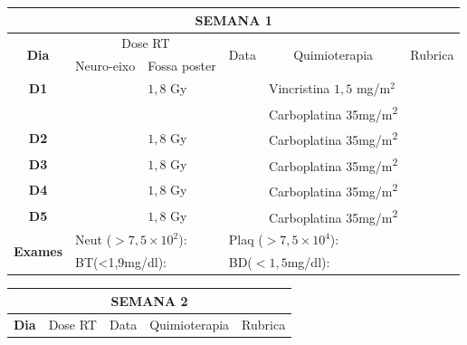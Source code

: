 \documentclass[11pt,a4paper,oldfontcommands]{memoir}
\begin{document}
\begin{center}
\begin{longtable}{p{1cm}p{2cm}|p{2cm}|p{1cm}|p{4cm}|p{3cm}}
	\hline
	\multicolumn{6}{c}{\textbf{SEMANA 1}}\\
\hline
    \multicolumn{1}{c|}{\multirow{2}{*}{\textbf{Dia}}}&\multicolumn{2}{c|}{Dose RT}&\multicolumn{1}{c|}{\multirow{2}{*}{Data}}&\multicolumn{1}{c|}{\multirow{2}{*}{Quimioterapia}}&\multicolumn{1}{c}{\multirow{2}{*}{Rubrica}} \\
    \cline{2-3}
    \multicolumn{1}{c|}{\multirow{1}{*}{}}&{Neuro-eixo}&{Fossa poster}&& \\
	\hline
	\multicolumn{1}{c|}{\multirow{1}{*}{\textbf{D1}}}&\multicolumn{1}{c|}{}&{\(1,8\) Gy}&&{Vincristina \(1,5\) mg/m\(^2\)}&\\
	\multicolumn{1}{c|}{\multirow{1}{*}{\textbf{}}}&\multicolumn{1}{c|}{}&&&{Carboplatina 35mg/m\textsuperscript{2}}&\\
    \multicolumn{1}{c|}{\multirow{1}{*}{\textbf{D2}}}&\multicolumn{1}{c|}{}&{\(1,8\) Gy}&&{Carboplatina 35mg/m\textsuperscript{2}}&\\
    \multicolumn{1}{c|}{\multirow{1}{*}{\textbf{D3}}}&\multicolumn{1}{c|}{}&{\(1,8\) Gy}&&{Carboplatina 35mg/m\textsuperscript{2}}&\\
    \multicolumn{1}{c|}{\multirow{1}{*}{\textbf{D4}}}&\multicolumn{1}{c|}{}&{\(1,8\) Gy}&&{Carboplatina 35mg/m\textsuperscript{2}}&\\
    \multicolumn{1}{c|}{\multirow{1}{*}{\textbf{D5}}}&\multicolumn{1}{c|}{}&{\(1,8\) Gy}&&{Carboplatina 35mg/m\textsuperscript{2}}&\\
    \hline
    \multicolumn{1}{c|}{\multirow{2}{*}{\textbf{Exames}}}&\multicolumn{2}{l|}{Neut (\(>7,5\times10^2\)):}&\multicolumn{2}{l|}{Plaq (\(>7,5\times10^4\)):}&\\
    \cline{2-6}
    \multicolumn{1}{c|}{\multirow{2}{*}{{}}}&\multicolumn{2}{l|}{BT(<1,9mg/dl):}&\multicolumn{2}{l|}{BD(\(<1,5\)mg/dl):}&\\
    \hline
\end{longtable}
\clearpage
\begin{longtable}{p{1cm}p{2cm}|p{2cm}|p{1cm}|p{4cm}|p{3cm}}
	\hline
	\multicolumn{6}{c}{\textbf{SEMANA 2}}\\
\hline
    \multicolumn{1}{c|}{\multirow{2}{*}{\textbf{Dia}}}&\multicolumn{2}{c|}{Dose RT}&\multicolumn{1}{c|}{\multirow{2}{*}{Data}}&\multicolumn{1}{c|}{\multirow{2}{*}{Quimioterapia}}&\multicolumn{1}{c}{\multirow{2}{*}{Rubrica}} \\

\end{longtable}
\end{center}
\end{document}
